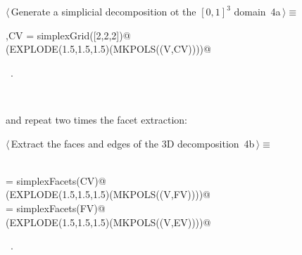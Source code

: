 \documentclass[11pt,oneside]{article}	%
\begin{document}
\begin{flushleft} \small
\begin{minipage}{\linewidth} \label{scrap5}
\protect{}$\langle\,$Generate a simplicial decomposition ot the $[0,1]^3$ domain\nobreak\ {\footnotesize 4a}$\,\rangle\equiv$
\vspace{-1ex}
\begin{list}{}{} \item
\mbox{}\verb@V,CV = simplexGrid([2,2,2])@\\
\mbox{}\verb@VIEW(EXPLODE(1.5,1.5,1.5)(MKPOLS((V,CV))))@\\
\mbox{}\verb@@{\NWsep}
\end{list}
\vspace{-1ex}
\footnotesize\addtolength{\baselineskip}{-1ex}
\begin{list}{}{\setlength{\itemsep}{-\parsep}\setlength{\itemindent}{-\leftmargin}}
\item \NWtxtMacroRefIn\ .
\end{list}
\end{minipage}\\[4ex]
\end{flushleft}

and repeat two times the facet extraction:

\begin{flushleft} \small
\begin{minipage}{\linewidth} \label{scrap6}
\protect{}$\langle\,$Extract the faces and edges of the 3D decomposition\nobreak\ {\footnotesize 4b}$\,\rangle\equiv$
\vspace{-1ex}
\begin{list}{}{} \item
\mbox{}\verb@@\\
\mbox{}\verb@FV = simplexFacets(CV)@\\
\mbox{}\verb@VIEW(EXPLODE(1.5,1.5,1.5)(MKPOLS((V,FV))))@\\
\mbox{}\verb@EV = simplexFacets(FV)@\\
\mbox{}\verb@VIEW(EXPLODE(1.5,1.5,1.5)(MKPOLS((V,EV))))@\\
\mbox{}\verb@@{\NWsep}
\end{list}
\vspace{-1ex}
\footnotesize\addtolength{\baselineskip}{-1ex}
\begin{list}{}{\setlength{\itemsep}{-\parsep}\setlength{\itemindent}{-\leftmargin}}
\item \NWtxtMacroRefIn\ .
\end{list}
\end{minipage}\\[4ex]
\end{flushleft}
\end{document}
